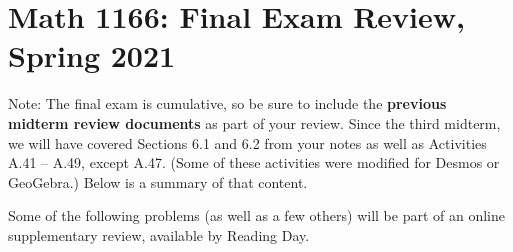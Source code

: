 \newpage

\section{Math 1166: Final Exam Review, Spring 2021}

Note:  The final exam is cumulative, so be sure to include the \textbf{previous midterm review documents} as part of your review.  
Since the third midterm, we will have covered Sections 6.1 and 6.2 from your notes as well as Activities A.41 -- A.49, except A.47.  (Some of these activities were modified for Desmos or GeoGebra.) Below is a summary of that content.  

Some of the following problems (as well as a few others) will be part of an online supplementary review, available by Reading Day.  



